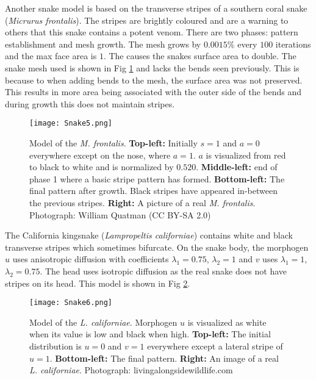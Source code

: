 Another snake model is based on the transverse stripes of a southern coral snake (\textit{Micrurus frontalis}). The stripes are brightly coloured and are a warning to others that this snake contains a potent venom. There are two phases: pattern establishment and mesh growth. The mesh grows by $0.0015\%$ every $100$ iterations and the max face area is $1$. The causes the snakes surface area to double. The snake mesh used is shown in Fig \ref{fig:Snake5} and lacks the bends seen previously. This is because to when adding bends to the mesh, the surface area was not preserved. This results in more area being associated with the outer side of the bends and during growth this does not maintain stripes.

\begin{figure}[ht]
	\centering
	\texttt{[image: Snake5.png]}
	\caption{Model of the \textit{M. frontalis}. \textbf{Top-left:} Initially $s=1$ and $a=0$ everywhere except on the nose, where $a=1$. $a$ is visualized from red to black to white and is normalized by $0.520$. \textbf{Middle-left:} end of phase 1 where a basic stripe pattern has formed. \textbf{Bottom-left:} The final pattern after growth. Black stripes have appeared in-between the previous stripes. \textbf{Right:} A picture of a real \textit{M. frontalis}. \textcolor{citation-gray}{Photograph: William Quatman (CC BY-SA 2.0)}}
	\label{fig:Snake5}
\end{figure}

\newpage 

The California kingsnake (\textit{Lampropeltis californiae}) contains white and black transverse stripes which sometimes bifurcate. On the snake body, the morphogen $u$ uses  anisotropic diffusion with coefficients $\lambda_{1}=0.75$, $\lambda_{2}=1$ and $v$ uses $\lambda_{1}=1$, $\lambda_{2}=0.75$. The head uses isotropic diffusion as the real snake does not have stripes on its head. This model is shown in Fig \ref{fig:Snake6}.

\begin{figure}[h]
	\centering
	\texttt{[image: Snake6.png]}
	\caption{Model of the \textit{L. californiae}. Morphogen $u$ is visualized as white when its value is low and black when high. \textbf{Top-left:} The initial distribution is $u=0$ and $v=1$ everywhere except a lateral stripe  of $u=1$. \textbf{Bottom-left:} The final pattern. \textbf{Right:} An image of a real \textit{L. californiae}. \textcolor{citation-gray}{Photograph: livingalongsidewildlife.com}} %
	\label{fig:Snake6}
\end{figure}

